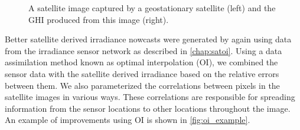 \begin{figure}[htbp]
\caption[Satellite image and irradiance estimate]{A satellite image
  captured by a geostationary satellite (left) and the GHI produced
  from this image (right).}
\label{fig:satimage_example}
\end{figure}

Better satellite derived irradiance nowcasts were generated by again
using data from the irradiance sensor network as described in
\cref{chap:satoi}.
Using a data assimilation method known as optimal interpolation (OI),
we combined the sensor data with the satellite derived irradiance
based on the relative errors between them.
We also parameterized the correlations between pixels in the satellite
images in various ways.
These correlations are responsible for spreading information from the
sensor locations to other locations throughout the image.
An example of improvements using OI is shown in \cref{fig:oi_example}.


